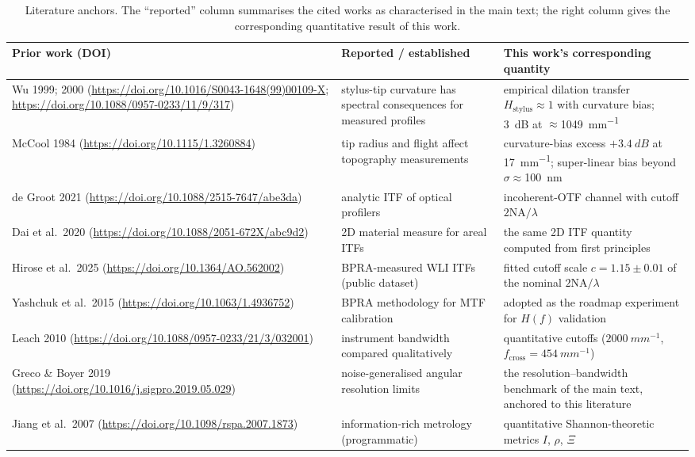 \documentclass[review,12pt]{elsarticle}
\begin{document}
\begin{table}[htbp]
    \centering
    \caption{Literature anchors. The ``reported'' column summarises the cited works as characterised in the main text; the right column gives the corresponding quantitative result of this work.}
    \label{tab:anchors}
    \small
    \setlength{\tabcolsep}{4pt}
    \begin{tabular}{p{3.6cm}p{5.0cm}p{5.2cm}}
        \toprule
        Prior work (DOI) & Reported / established & This work's corresponding quantity \\
        \midrule
        Wu 1999; 2000 (\url{https://doi.org/10.1016/S0043-1648(99)00109-X}; \url{https://doi.org/10.1088/0957-0233/11/9/317}) & stylus-tip curvature has spectral consequences for measured profiles & empirical dilation transfer $H_\mathrm{stylus}\approx1$ with curvature bias; \SI{3}{dB} at $\approx$\SI{1049}{mm^{-1}} \\
        \addlinespace
        McCool 1984 (\url{https://doi.org/10.1115/1.3260884}) & tip radius and flight affect topography measurements & curvature-bias excess $+\SI{3.4}{dB}$ at \SI{17}{mm^{-1}}; super-linear bias beyond $\sigma\approx$\SI{100}{nm} \\
        \addlinespace
        de Groot 2021 (\url{https://doi.org/10.1088/2515-7647/abe3da}) & analytic ITF of optical profilers & incoherent-OTF channel with cutoff $2\mathrm{NA}/\lambda$ \\
        \addlinespace
        Dai et al.\ 2020 (\url{https://doi.org/10.1088/2051-672X/abc9d2}) & 2D material measure for areal ITFs & the same 2D ITF quantity computed from first principles \\
        \addlinespace
        Hirose et al.\ 2025 (\url{https://doi.org/10.1364/AO.562002}) & BPRA-measured WLI ITFs (public dataset) & fitted cutoff scale $c=1.15\pm0.01$ of the nominal $2\mathrm{NA}/\lambda$ \\
        \addlinespace
        Yashchuk et al.\ 2015 (\url{https://doi.org/10.1063/1.4936752}) & BPRA methodology for MTF calibration & adopted as the roadmap experiment for $H(f)$ validation \\
        \addlinespace
        Leach 2010 (\url{https://doi.org/10.1088/0957-0233/21/3/032001}) & instrument bandwidth compared qualitatively & quantitative cutoffs ($\SI{2000}{mm^{-1}}$, $f_\mathrm{cross}=\SI{454}{mm^{-1}}$) \\
        \addlinespace
        Greco \& Boyer 2019 (\url{https://doi.org/10.1016/j.sigpro.2019.05.029}) & noise-generalised angular resolution limits & the resolution--bandwidth benchmark of the main text, anchored to this literature \\
        \addlinespace
        Jiang et al.\ 2007 (\url{https://doi.org/10.1098/rspa.2007.1873}) & information-rich metrology (programmatic) & quantitative Shannon-theoretic metrics $I$, $\rho$, $\Xi$ \\
        \bottomrule
    \end{tabular}
\end{table}
\end{document}
